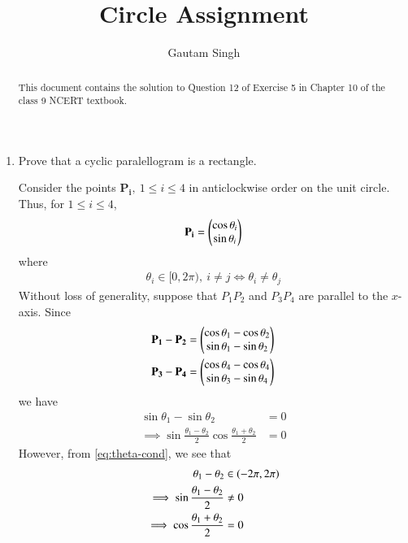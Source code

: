 \documentclass[journal,12pt,twocolumn]{IEEEtran}
\renewcommand{\vec}[1]{\boldsymbol{\mathbf{#1}}}
\begin{document}
\vspace{3cm}
\title{Circle Assignment}
\author{Gautam Singh}
\maketitle
\bigskip

\begin{abstract}
    This document contains the solution to Question 12 of 
    Exercise 5 in Chapter 10 of the class 9 NCERT textbook.
\end{abstract}

\begin{enumerate}
    \item Prove that a cyclic paralellogram is a rectangle.

    \solution Consider the points $\vec{P_i},\ 1 \le i \le 4$ in anticlockwise 
    order on the unit circle. Thus, for $1 \le i \le 4$,
    \begin{align}
        \vec{P_i} = \myvec{\cos\theta_i\\\sin\theta_i} 
        \label{eq:circ-point}
    \end{align}
    where 
    \begin{align}
        \theta_i \in [0,2\pi),\ i \neq j \iff \theta_i \neq \theta_j
        \label{eq:theta-cond}
    \end{align}
    Without loss of generality, suppose that $P_1P_2$ and $P_3P_4$ are parallel 
    to the $x$-axis. Since
    \begin{align}
        \vec{P_1}-\vec{P_2} &= \myvec{\cos\theta_1-\cos\theta_2\\\sin\theta_1-\sin\theta_2} \\
        \vec{P_3}-\vec{P_4} &= \myvec{\cos\theta_4-\cos\theta_4\\\sin\theta_3-\sin\theta_4}
    \end{align}
    we have
    \begin{align}
        \sin\theta_1-\sin\theta_2 &= 0 \\
        \implies \sin\frac{\theta_1-\theta_2}{2}\cos\frac{\theta_1+\theta_2}{2} &= 0
        \label{eq:x-par}
    \end{align}
    However, from \eqref{eq:theta-cond}, we see that
    \begin{align}
        \theta_1-\theta_2 &\in \brak{-2\pi,2\pi} \\
        \implies \sin\frac{\theta_1-\theta_2}{2} &\neq 0 \\
        \implies \cos\frac{\theta_1+\theta_2}{2} &= 0 \\

\end{align}
\end{enumerate}
\end{document}
